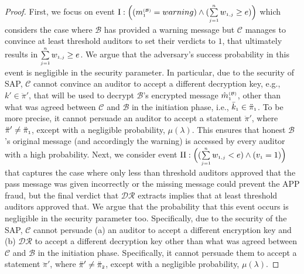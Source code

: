 \begin{proof}
 First, we focus on event $\text{\MakeUppercase{\romannumeral 1}}:  \Big((m^{\st\mathcal{(B)}}_{\st1}=warning) \wedge (\sum\limits_{\st j=1}^{\st n}w_{\st 1,j}\geq {e})\Big)$ which considers the case where $\mathcal{B}$ has provided a warning message but $\mathcal{C}$ manages to  convince at least threshold auditors to  set their verdicts to $1$,  that ultimately results in $\sum\limits_{\scriptscriptstyle j=1}^{\scriptscriptstyle n}w_{\scriptscriptstyle 1,j}\geq e$. We argue that the adversary's success probability in this event is negligible  in the security parameter. In particular, due to the security of SAP, $\mathcal{C}$ cannot convince an auditor to accept a different decryption key, e.g., $k'\in \ddot\pi'$, that will be used to decrypt $\mathcal{B}$'s encrypted message $\hat {m}^{\scriptscriptstyle(\mathcal {B})}_{\scriptscriptstyle 1}$, other than what was agreed between $\mathcal{C}$ and $\mathcal{B}$ in the initiation phase, i.e., $\bar k_{\scriptscriptstyle 1}\in \ddot \pi_{\scriptscriptstyle 1}$.  To be more precise, it cannot persuade an auditor to accept a statement $\ddot \pi'$, where $\ddot \pi'\neq \ddot \pi_{\scriptscriptstyle 1}$, except with a negligible probability, $\mu(\lambda)$. This ensures that  honest $\mathcal{B}$’s original message (and accordingly the warning) is accessed by every auditor with a high probability. Next, we consider event  $\text{\MakeUppercase{\romannumeral 2}}:  \Big((\sum\limits_{\st j=1}^{\st n}w_{\st 1,j}<{e}) \wedge ( {v}_{\st 1}=1)\Big)$ that captures the case where only less than  threshold auditors approved that the pass message was given incorrectly or the missing message could  prevent the APP fraud, but the final verdict that $\mathcal{DR}$ extracts implies that at least threshold auditors approved that. We argue that the probability that this event occurs is negligible in the security parameter too. Specifically, due to the security of the SAP,  $\mathcal{C}$ cannot persuade (a)  an auditor to accept a different encryption key and (b) $\mathcal{DR}$ to accept a different decryption key other than what was agreed between $\mathcal{C}$ and $\mathcal{B}$ in the initiation phase. Specifically, it cannot persuade them to accept a statement $\ddot \pi'$, where $\ddot \pi'\neq \ddot \pi_{\scriptscriptstyle 2}$, except with a negligible probability, $\mu(\lambda)$. %
 

\end{proof}
